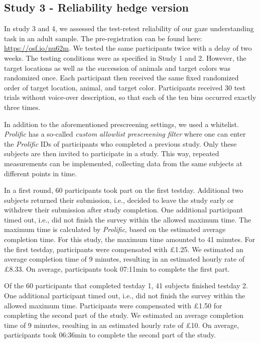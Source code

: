 \documentclass[
  man,floatsintext]{apa6}
\begin{document}
\hypertarget{study-3---reliability-hedge-version}{%
\subsection{Study 3 - Reliability hedge version}\label{study-3---reliability-hedge-version}}

In study 3 and 4, we assessed the test-retest reliability of our gaze understanding task in an adult sample.
The pre-registration can be found here: \url{https://osf.io/nu62m}.
We tested the same participants twice with a delay of two weeks.
The testing conditions were as specified in Study 1 and 2.
However, the target locations as well as the succession of animals and target colors was randomized once.
Each participant then received the same fixed randomized order of target location, animal, and target color.
Participants received 30 test trials without voice-over description, so that each of the ten bins occurred exactly three times.

In addition to the aforementioned prescreening settings, we used a whitelist.
\emph{Prolific} has a so-called \emph{custom allowlist prescreening filter} where one can enter the \emph{Prolific} IDs of participants who completed a previous study.
Only these subjects are then invited to participate in a study.
This way, repeated measurements can be implemented, collecting data from the same subjects at different points in time.

In a first round, 60 participants took part on the first testday.
Additional two subjects returned their submission, i.e., decided to leave the study early or withdrew their submission after study completion.
One additional participant timed out, i.e., did not finish the survey within the allowed maximum time.
The maximum time is calculated by \emph{Prolific}, based on the estimated average completion time.
For this study, the maximum time amounted to 41 minutes.
For the first testday, participants were compensated with £1.25.
We estimated an average completion time of 9 minutes, resulting in an estimated hourly rate of £8.33.
On average, participants took 07:11min to complete the first part.

Of the 60 participants that completed testday 1, 41 subjects finished testday 2.
One additional participant timed out, i.e., did not finish the survey within the allowed maximum time.
Participants were compensated with £1.50 for completing the second part of the study.
We estimated an average completion time of 9 minutes, resulting in an estimated hourly rate of £10.
On average, participants took 06:36min to complete the second part of the study.
\end{document}
